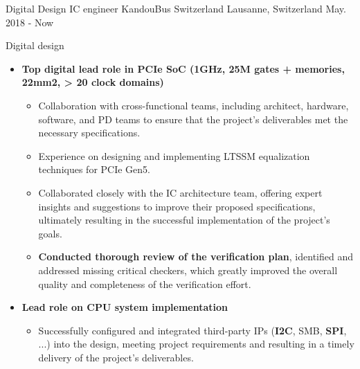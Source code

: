 

\begin{cventries}

  \cventry
    {Digital Design IC engineer} %
    {KandouBus Switzerland} %
    {Lausanne, Switzerland} %
    {May. 2018 - Now} %
    {
      \begin{cvitems} %
        \item {Digital design}
        \begin{itemize}
          \item {\textbf{Top digital lead role in PCIe SoC (1GHz, 25M gates + memories, 22mm2, > 20 clock domains)}}
          \begin{itemize}
            \item {Collaboration with cross-functional teams, including architect, hardware, software, and PD teams to ensure that the project's deliverables met the necessary specifications.}
            \item {Experience on designing and implementing LTSSM equalization techniques for PCIe Gen5.}
            \item {Collaborated closely with the IC architecture team, offering expert insights and suggestions to improve their proposed specifications, ultimately resulting in the successful implementation of the project's goals.}
            \item {\textbf{Conducted thorough review of the verification plan}, identified and addressed missing critical checkers, which greatly improved the overall quality and completeness of the verification effort.}
          \end{itemize}
          \item {\textbf{Lead role on CPU system implementation}}
          \begin{itemize}
            \item {Successfully configured and integrated third-party IPs (\textbf{I2C}, SMB, \textbf{SPI}, ...) into the design, meeting project requirements and resulting in a timely delivery of the project's deliverables.}

\end{itemize}
\end{itemize}
\end{cvitems}}
\end{cventries}
